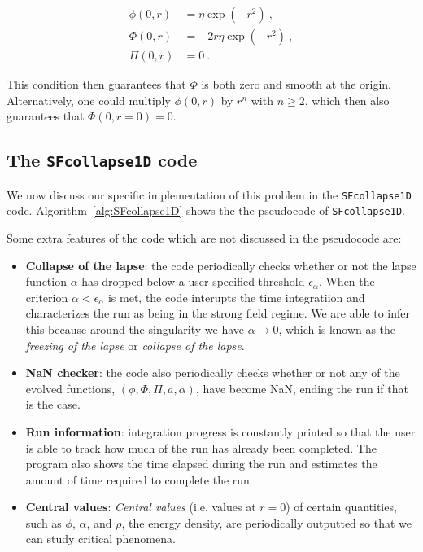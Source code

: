 \documentclass[a4paper,11pt]{article}
\renewcommand{\a}{\alpha}
\newcommand{\e}{\epsilon}
\newcommand{\lrpar}[1]{\left( #1 \right)}
\newcommand{\n}{\noindent}
\newcommand{\eq}[1]{
  \begin{equation}
    #1
  \end{equation}
}
\newcommand{\spl}[1]{
  \begin{split}
    #1
  \end{split}
}
\begin{document}
\eq{
  \spl{
    \phi(0,r) &= \eta\exp\lrpar{-r^{2}}\ ,\\
    \Phi(0,r) &= -2r\eta\exp\lrpar{-r^{2}}\ ,\\
    \Pi(0,r) &= 0\ .
  }
  \label{eq:initial_condition_new}
}

\n This condition then guarantees that $\Phi$ is both zero and smooth at the origin. Alternatively, one could multiply $\phi(0,r)$ by $r^{n}$ with $n\geq2$, which then also guarantees that $\Phi(0,r=0)=0$.

\subsection{The {\tt SFcollapse1D} code}

We now discuss our specific implementation of this problem in the {\tt SFcollapse1D} code. Algorithm~\ref{alg:SFcollapse1D} shows the the pseudocode of {\tt SFcollapse1D}.

Some extra features of the code which are not discussed in the pseudocode are:

\begin{itemize}
  \item \textbf{Collapse of the lapse}: the code periodically checks whether or not the lapse function $\a$ has dropped below a user-specified threshold $\e_{\a}$. When the criterion $\a<\e_{\a}$ is met, the code interupts the time integratiion and characterizes the run as being in the strong field regime. We are able to infer this because around the singularity we have $\a \to 0$, which is known as the \emph{freezing of the lapse} or \emph{collapse of the lapse}.

  \item \textbf{NaN checker}: the code also periodically checks whether or not any of the evolved functions, $\lrpar{\phi,\Phi,\Pi,a,\a}$, have become NaN, ending the run if that is the case.

  \item \textbf{Run information}: integration progress is constantly printed so that the user is able to track how much of the run has already been completed. The program also shows the time elapsed during the run and estimates the amount of time required to complete the run.

  \item \textbf{Central values}: \emph{Central values} (i.e. values at $r=0$) of certain quantities, such as $\phi$, $\a$, and $\rho$, the energy density, are periodically outputted so that we can study critical phenomena.
\end{itemize}
\end{document}
